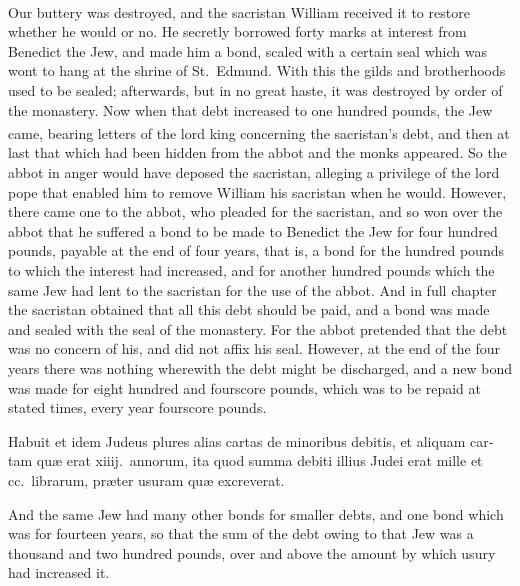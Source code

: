 \documentclass{book}
\newcounter{engnote}
\newcommand{\engnotenum}{\textsuperscript{\arabic{engnote}\stepcounter{engnote}}}
\begin{document}
\begin{paracol}{2}
Our buttery was destroyed, and the sacristan William\engnotenum{} received it to restore whether he would or no. He secretly borrowed forty marks at interest from Benedict the Jew, and made him a bond, scaled with a certain seal which was wont to hang at the shrine of St.\ Edmund. With this the gilds and brotherhoods used to be sealed; afterwards, but in no great haste, it was destroyed by order of the monastery. Now when that debt increased to one hundred pounds, the Jew came, bearing letters of the lord king\engnotenum{} concerning the sacristan's debt, and then at last that which had been hidden from the abbot and the monks appeared. So the abbot in anger would have deposed the sacristan, alleging a privilege of the lord pope that enabled him to remove William his sacristan when he would. However, there came one to the abbot, who pleaded for the sacristan, and so won over the abbot that he suffered a bond to be made to Benedict the Jew for four hundred pounds, payable at the end of four years, that is, a bond for the hundred pounds to which the interest had increased, and for another hundred pounds which the same Jew had lent to the sacristan for the use of the abbot. And in full chapter the sacristan obtained that all this debt should be paid, and a bond was made and sealed with the seal of the monastery. For the abbot pretended that the debt was no concern of his, and did not affix his seal. However, at the end of the four years there was nothing wherewith the debt might be discharged, and a new bond was made for eight hundred and fourscore pounds, which was to be repaid at stated times, every year fourscore pounds.

\switchcolumn*

\begin{otherlanguage}{latin}
Habuit et idem Judeus plures alias cartas de minoribus debitis, et aliquam cartam qu\ae{} erat xiiij.\ annorum, ita quod summa debiti illius Judei erat mille et cc.\ librarum, pr\ae{}ter usuram qu\ae{} excreverat.
\end{otherlanguage}

\switchcolumn

And the same Jew had many other bonds for smaller debts, and one bond which was for fourteen years, so that the sum of the debt owing to that Jew was a thousand and two hundred pounds, over and above the amount by which usury had increased it.

\switchcolumn*


\end{paracol}
\end{document}

